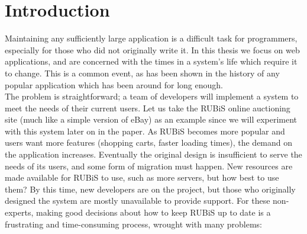 \documentclass[msc,oneside]{ubcthesis}
\begin{document}


%
%

\chapter{Introduction} %


Maintaining any sufficiently large application is a difficult task for programmers, especially for those who did not originally write it. In this thesis we focus on web applications, and are concerned with the times in a system's life which require it to change. This is a common event, as has been shown in the history of any popular application which has been around for long enough.\\

The problem is straightforward; a team of developers will implement a system to meet the needs of their current users. Let us take the RUBiS online auctioning site (much like a simple version of eBay) as an example since we will experiment with this system later on in the paper. As RUBiS becomes more popular and users want more features (shopping carts, faster loading times), the demand on the application increases. Eventually the original design is insufficient to serve the needs of its users, and some form of migration must happen. New resources are made available for RUBiS to use, such as more servers, but how best to use them? By this time, new developers are on the project, but those who originally designed the system are mostly unavailable to provide support. For these non-experts, making good decisions about how to keep RUBiS up to date is a frustrating and time-consuming process, wrought with many problems:\\
\end{document}
